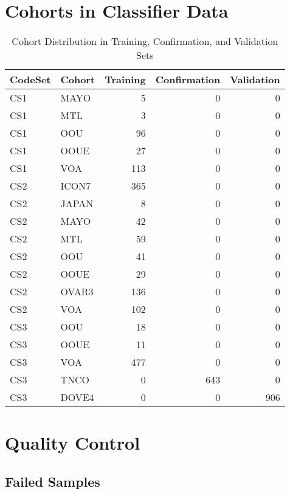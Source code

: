\documentclass[
]{report}
\begin{document}
\hypertarget{cohorts-in-classifier-data}{%
\section{Cohorts in Classifier Data}\label{cohorts-in-classifier-data}}

\begin{table}

\caption{\label{tab:cohort-dist}Cohort Distribution in Training, Confirmation, and Validation Sets}
\centering
\begin{tabular}[t]{l|l|r|r|r}
\hline
CodeSet & Cohort & Training & Confirmation & Validation\\
\hline
CS1 & MAYO & 5 & 0 & 0\\
\hline
CS1 & MTL & 3 & 0 & 0\\
\hline
CS1 & OOU & 96 & 0 & 0\\
\hline
CS1 & OOUE & 27 & 0 & 0\\
\hline
CS1 & VOA & 113 & 0 & 0\\
\hline
CS2 & ICON7 & 365 & 0 & 0\\
\hline
CS2 & JAPAN & 8 & 0 & 0\\
\hline
CS2 & MAYO & 42 & 0 & 0\\
\hline
CS2 & MTL & 59 & 0 & 0\\
\hline
CS2 & OOU & 41 & 0 & 0\\
\hline
CS2 & OOUE & 29 & 0 & 0\\
\hline
CS2 & OVAR3 & 136 & 0 & 0\\
\hline
CS2 & VOA & 102 & 0 & 0\\
\hline
CS3 & OOU & 18 & 0 & 0\\
\hline
CS3 & OOUE & 11 & 0 & 0\\
\hline
CS3 & VOA & 477 & 0 & 0\\
\hline
CS3 & TNCO & 0 & 643 & 0\\
\hline
CS3 & DOVE4 & 0 & 0 & 906\\
\hline
\end{tabular}
\end{table}

\hypertarget{quality-control}{%
\section{Quality Control}\label{quality-control}}

\hypertarget{failed-samples}{%
\subsection{Failed Samples}\label{failed-samples}}
\end{document}
